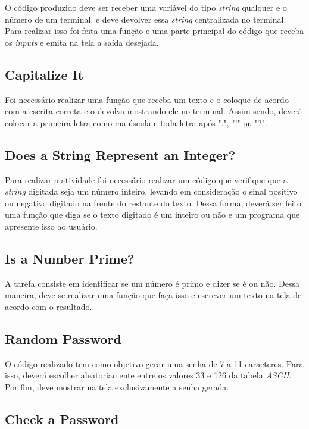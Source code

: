 O código produzido deve ser receber uma variável do tipo \textit{string} qualquer e o número de um terminal, e deve devolver essa \textit{string} centralizada no terminal. Para realizar isso foi feita uma função e uma parte principal do código que receba os \textit{inputs} e emita na tela a saída desejada.

\subsection{Capitalize It}

Foi necessário realizar uma função que receba um texto e o coloque de acordo com a escrita correta e o devolva mostrando ele no terminal. Assim sendo, deverá colocar a primeira letra como maiúscula e toda letra após ".", "!" ou "?". 

\subsection{Does a String Represent an Integer?}

Para realizar a atividade foi necessário realizar um código que verifique que a \textit{string} digitada seja um número inteiro, levando em consideração o sinal positivo ou negativo digitado na frente do restante do texto. Dessa forma, deverá ser feito uma função que diga se o texto digitado é um inteiro ou não e um programa que apresente isso ao usuário.

\subsection{Is a Number Prime?}

A tarefa consiste em identificar se um número é primo e dizer se é ou não. Dessa maneira, deve-se realizar uma função que faça isso e escrever um texto na tela de acordo com o resultado.

\subsection{Random Password}

O código realizado tem como objetivo gerar uma senha de 7 a 11 caracteres. Para isso, deverá escolher aleatoriamente entre os valores 33 e 126 da tabela \textit{ASCII}. Por fim, deve mostrar na tela exclusivamente a senha gerada.

\subsection{Check a Password}

